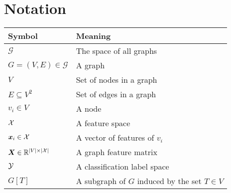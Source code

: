\chapter*{Notation}

\begin{tabular}{ll}
	\toprule
	\textbf{Symbol} & \textbf{Meaning} \\
	\midrule
	\( \mathcal{G} \) & The space of all graphs \\
	\( G = \left( V, E \right) \in \mathcal{G} \) & A graph \\
	\( V \) & Set of nodes in a graph \\
	\( E \subseteq V^2 \) & Set of edges in a graph \\
	\( v_i \in V \) & A node \\
	\( \mathcal{X} \) & A feature space \\
	\( \bm{x}_i \in \mathcal{X} \) & A vector of features of \( v_i \) \\
	\( \bm{X} \in \mathbb{R}^{\left\lvert V \right\rvert \times \left\lvert \mathcal{X} \right\rvert} \) & A graph feature matrix	\\
	\( \mathcal{Y} \) & A classification label space \\
	\( G \left[ T \right] \) & A subgraph of \( G \) induced by the set \( T \in V \) \\
	\bottomrule
\end{tabular}

